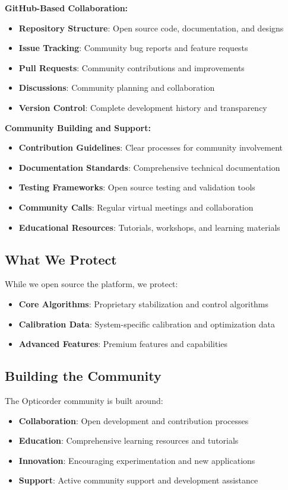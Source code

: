 \documentclass[11pt,a4paper]{article}
\begin{document}
\textbf{GitHub-Based Collaboration:}
\begin{itemize}
\item \textbf{Repository Structure}: Open source code, documentation, and designs
\item \textbf{Issue Tracking}: Community bug reports and feature requests
\item \textbf{Pull Requests}: Community contributions and improvements
\item \textbf{Discussions}: Community planning and collaboration
\item \textbf{Version Control}: Complete development history and transparency
\end{itemize}

\textbf{Community Building and Support:}
\begin{itemize}
\item \textbf{Contribution Guidelines}: Clear processes for community involvement
\item \textbf{Documentation Standards}: Comprehensive technical documentation
\item \textbf{Testing Frameworks}: Open source testing and validation tools
\item \textbf{Community Calls}: Regular virtual meetings and collaboration
\item \textbf{Educational Resources}: Tutorials, workshops, and learning materials
\end{itemize}

\subsection{What We Protect}
While we open source the platform, we protect:
\begin{itemize}
\item \textbf{Core Algorithms}: Proprietary stabilization and control algorithms
\item \textbf{Calibration Data}: System-specific calibration and optimization data
\item \textbf{Advanced Features}: Premium features and capabilities
\end{itemize}

\subsection{Building the Community}
The Opticorder community is built around:
\begin{itemize}
\item \textbf{Collaboration}: Open development and contribution processes
\item \textbf{Education}: Comprehensive learning resources and tutorials
\item \textbf{Innovation}: Encouraging experimentation and new applications
\item \textbf{Support}: Active community support and development assistance
\end{itemize}
\end{document}
